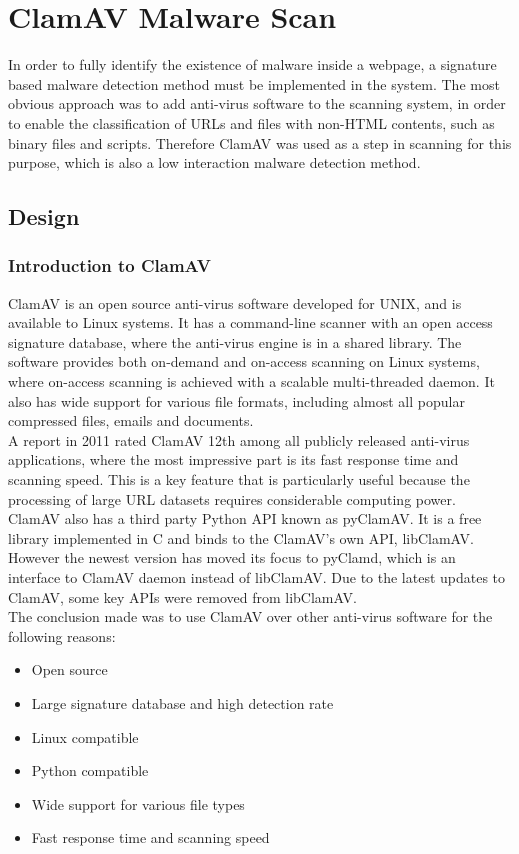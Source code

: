 
\section{ClamAV Malware Scan}
In order to fully identify the existence of malware inside a webpage, a 
signature based malware detection method must be implemented in the system. 
The most obvious approach was to add anti-virus software to the scanning system, 
in order to enable the classification of URLs and files with non-HTML contents, such 
as binary files and scripts. Therefore ClamAV was used as a step in scanning for this purpose, which is also a low interaction malware detection 
method.

\subsection{Design}
\subsubsection{Introduction to ClamAV}
ClamAV is an open source anti-virus software developed for UNIX, and is 
available to Linux systems. It has a command-line scanner with an open access 
signature database, where the anti-virus engine is in a shared library. 
The software provides both on-demand and on-access scanning on Linux systems, 
where on-access scanning is achieved with a scalable multi-threaded daemon. 
It also has wide support for various file formats, including almost all 
popular compressed files, emails and documents. \\
A report in 2011 rated ClamAV 12th among all publicly released anti-virus 
applications,\cite{shandowserver} where the most impressive part is its fast 
response time and scanning speed. This is a key feature that is particularly useful 
because the processing of large URL
datasets requires considerable computing power. \\
ClamAV also has a third party Python API known as pyClamAV. It is a free 
library implemented in C and binds to the ClamAV's own API, libClamAV. However 
the newest version has moved its focus to pyClamd, which is an interface to ClamAV 
daemon instead of libClamAV. Due to the latest updates to ClamAV, some 
key APIs were removed from libClamAV. \\
The conclusion made was to use ClamAV over other 
anti-virus software for the following reasons: 
\begin{itemize}
\item Open source
\item Large signature database and high detection rate
\item Linux compatible
\item Python compatible
\item Wide support for various file types
\item Fast response time and scanning speed
\end{itemize}

